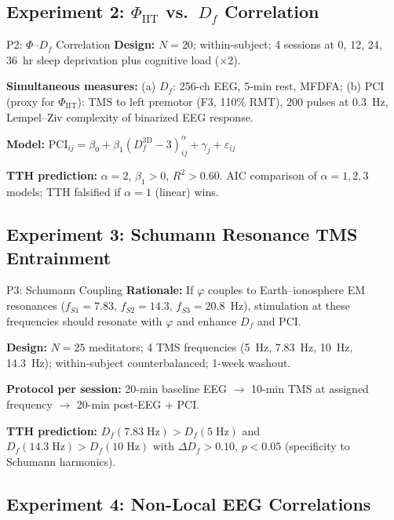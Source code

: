 \documentclass[12pt,a4paper]{article}
\newcommand{\phiIIT}{\Phi_{\mathrm{IIT}}}
\numberwithin{equation}{section}
\begin{document}
\subsection{Experiment 2: $\phiIIT$ vs.\ $D_f$ Correlation}

\begin{protocol}{P2: $\Phi$--$D_f$ Correlation}{}
\textbf{Design:} $N=20$; within-subject; 4 sessions at 0, 12, 24, 36~hr sleep deprivation
plus cognitive load ($\times$2).

\textbf{Simultaneous measures:}
(a) $D_f$: 256-ch EEG, 5-min rest, MFDFA;
(b) PCI (proxy for $\phiIIT$): TMS to left premotor (F3, 110\% RMT),
200 pulses at 0.3~Hz, Lempel--Ziv complexity of binarized EEG response.

\textbf{Model:}
$\mathrm{PCI}_{ij} = \beta_0 + \beta_1(D_f^{\mathrm{3D}} - 3)^\alpha_{ij}
+ \gamma_j + \varepsilon_{ij}$

\textbf{TTH prediction:} $\alpha = 2$, $\beta_1 > 0$, $R^2 > 0.60$.
AIC comparison of $\alpha = 1, 2, 3$ models; TTH falsified if $\alpha = 1$
(linear) wins.
\end{protocol}

\subsection{Experiment 3: Schumann Resonance TMS Entrainment}

\begin{protocol}{P3: Schumann Coupling}{}
\textbf{Rationale:} If $\varphi$ couples to Earth--ionosphere EM resonances
($f_{S1} = 7.83$, $f_{S2} = 14.3$, $f_{S3} = 20.8$~Hz), stimulation at
these frequencies should resonate with $\varphi$ and enhance $D_f$ and PCI.

\textbf{Design:} $N=25$ meditators; 4 TMS frequencies (5~Hz, 7.83~Hz,
10~Hz, 14.3~Hz); within-subject counterbalanced; 1-week washout.

\textbf{Protocol per session:} 20-min baseline EEG
$\to$ 10-min TMS at assigned frequency
$\to$ 20-min post-EEG + PCI.

\textbf{TTH prediction:}
$D_f(7.83\;\mathrm{Hz}) > D_f(5\;\mathrm{Hz})$ and
$D_f(14.3\;\mathrm{Hz}) > D_f(10\;\mathrm{Hz})$
with $\Delta D_f > 0.10$, $p < 0.05$ (specificity to Schumann harmonics).
\end{protocol}

\subsection{Experiment 4: Non-Local EEG Correlations}
\end{document}
